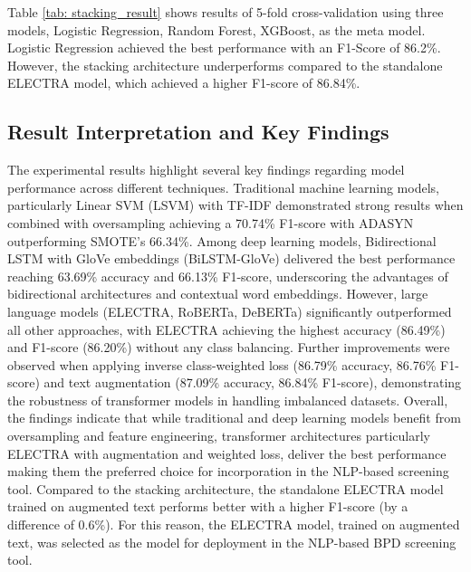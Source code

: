 \vspace{-\baselineskip}
\vspace{0.8em}


Table \ref{tab: stacking_result} shows results of 5-fold cross-validation using three models, Logistic Regression, Random Forest, XGBoost, as the meta model. Logistic Regression achieved the best performance with an F1-Score of 86.2\%. However, the stacking architecture underperforms compared to the standalone ELECTRA model, which achieved a higher F1-score of 86.84\%.

\subsection{Result Interpretation and Key Findings}
The experimental results highlight several key findings regarding model performance across different techniques. Traditional machine learning models, particularly Linear SVM (LSVM) with TF-IDF demonstrated strong results when combined with oversampling achieving a 70.74\% F1-score with ADASYN outperforming SMOTE’s 66.34\%. Among deep learning models, Bidirectional LSTM with GloVe embeddings (BiLSTM-GloVe) delivered the best performance reaching 63.69\% accuracy and 66.13\% F1-score, underscoring the advantages of bidirectional architectures and contextual word embeddings. However, large language models (ELECTRA, RoBERTa, DeBERTa) significantly outperformed all other approaches, with ELECTRA achieving the highest accuracy (86.49\%) and F1-score (86.20\%) without any class balancing. Further improvements were observed when applying inverse class-weighted loss (86.79\% accuracy, 86.76\% F1-score) and text augmentation (87.09\% accuracy, 86.84\% F1-score), demonstrating the robustness of transformer models in handling imbalanced datasets. Overall, the findings indicate that while traditional and deep learning models benefit from oversampling and feature engineering, transformer architectures particularly ELECTRA with augmentation and weighted loss, deliver the best performance making them the preferred choice for incorporation in the NLP-based screening tool. Compared to the stacking architecture, the standalone ELECTRA model trained on augmented text performs better with a higher F1-score (by a difference of 0.6\%). For this reason, the ELECTRA model, trained on augmented text, was selected as the model for deployment in the NLP-based BPD screening tool.
